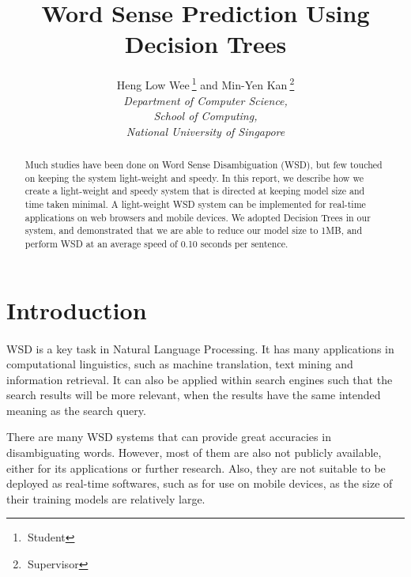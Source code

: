 \documentclass[a4paper,12pt]{nurop}
\begin{document}
\title{Word Sense Prediction Using Decision Trees}

\author{\large{Heng Low Wee}$~$\footnote{$~$Student} and \large{Min-Yen Kan}$~$\footnote{$~$Supervisor}\\
	\normalsize\textit{Department of Computer Science,\\
	School of Computing,\\
	National University of Singapore} 
}
\maketitle

\begin{abstract}
\paragraph{}
Much studies have been done on Word Sense Disambiguation (WSD), but few touched on keeping the system light-weight and speedy. In this report, we describe how we create a light-weight and speedy system that is directed at keeping model size and time taken minimal. A light-weight WSD system can be implemented for real-time applications on web browsers and mobile devices. We adopted Decision Trees in our system, and demonstrated that we are able to reduce our model size to 1MB, and perform WSD at an average speed of 0.10 seconds per sentence.
\end{abstract}

\section{Introduction}
\paragraph{}
WSD is a key task in Natural Language Processing. It has many applications in computational linguistics, such as machine translation, text mining and information retrieval. It can also be applied within search engines such that the search results will be more relevant, when the results have the same intended meaning as the search query.

There are many WSD systems that can provide great accuracies in disambiguating words. However, most of them are also not publicly available, either for its applications or further research. Also, they are not suitable to be deployed as real-time softwares, such as for use on mobile devices, as the size of their training models are relatively large.
\end{document}
